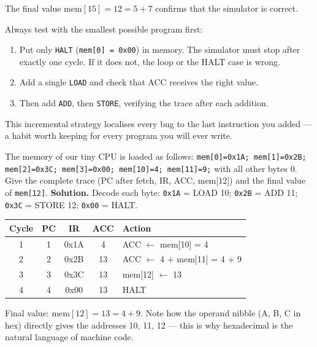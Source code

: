 \documentclass[11pt]{article}
\begin{document}
The final value $\text{mem}[15] = 12 = 5 + 7$ confirms that the simulator is correct.

\begin{methode}
Always test with the smallest possible program first:
\begin{enumerate}
\item Put only \texttt{HALT} (\texttt{mem[0] = 0x00}) in memory. The simulator must stop after exactly one cycle. If it does not, the loop or the HALT case is wrong.
\item Add a single \texttt{LOAD} and check that ACC receives the right value.
\item Then add \texttt{ADD}, then \texttt{STORE}, verifying the trace after each addition.
\end{enumerate}
This incremental strategy localises every bug to the last instruction you added --- a habit worth keeping for every program you will ever write.
\end{methode}

\begin{exoresolu}
The memory of our tiny CPU is loaded as follows:
\texttt{mem[0]=0x1A; mem[1]=0x2B; mem[2]=0x3C; mem[3]=0x00; mem[10]=4; mem[11]=9;} with all other bytes 0. Give the complete trace (PC after fetch, IR, ACC, mem[12]) and the final value of \texttt{mem[12]}.
\tcblower
\textbf{Solution.} Decode each byte: \texttt{0x1A} = LOAD 10; \texttt{0x2B} = ADD 11; \texttt{0x3C} = STORE 12; \texttt{0x00} = HALT.
\begin{center}
\begin{tabularx}{\linewidth}{|c|c|c|c|X|}
\hline
\rowcolor{popblueL} \textbf{Cycle} & \textbf{PC} & \textbf{IR} & \textbf{ACC} & \textbf{Action} \\
\hline
1 & 1 & 0x1A & 4 & ACC $\leftarrow$ mem[10] = 4 \\
\hline
2 & 2 & 0x2B & 13 & ACC $\leftarrow$ 4 + mem[11] = 4 + 9 \\
\hline
3 & 3 & 0x3C & 13 & mem[12] $\leftarrow$ 13 \\
\hline
4 & 4 & 0x00 & 13 & HALT \\
\hline
\end{tabularx}
\end{center}
Final value: $\text{mem}[12] = 13 = 4 + 9$. Note how the operand nibble (A, B, C in hex) directly gives the addresses 10, 11, 12 --- this is why hexadecimal is the natural language of machine code.
\end{exoresolu}
\end{document}
